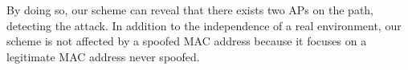 \documentclass[conference]{IEEEtran}
\begin{document}
By doing so, our scheme can reveal that there exists two APs on the path, detecting the attack.
In addition to the independence of a real environment, our scheme is not affected by a spoofed MAC address because it focuses on a legitimate MAC address never spoofed.

\end{document}
